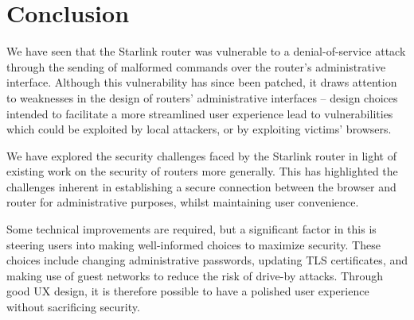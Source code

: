 \section{Conclusion}\label{sec:conclusion}

We have seen that the Starlink router was vulnerable to a denial-of-service attack through the sending of malformed commands over the router's administrative interface.
Although this vulnerability has since been patched, it draws attention to weaknesses in the design of routers' administrative interfaces -- design choices intended to facilitate a more streamlined user experience lead to vulnerabilities which could be exploited by local attackers, or by exploiting victims' browsers.

We have explored the security challenges faced by the Starlink router in light of existing work on the security of routers more generally.
This has highlighted the challenges inherent in establishing a secure connection between the browser and router for administrative purposes, whilst maintaining user convenience.

Some technical improvements are required, but a significant factor in this is steering users into making well-informed choices to maximize security.
These choices include changing administrative passwords, updating TLS certificates, and making use of guest networks to reduce the risk of drive-by attacks.
Through good UX design, it is therefore possible to have a polished user experience without sacrificing security.

